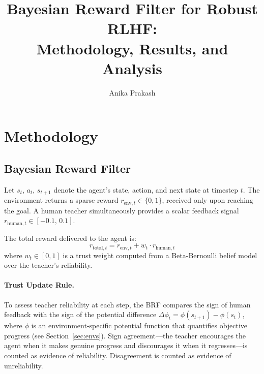 \documentclass[11pt]{article}
\title{Bayesian Reward Filter for Robust RLHF:\\
       Methodology, Results, and Analysis}
\author{Anika Prakash}
\date{}
\begin{document}
\maketitle

\section{Methodology}

\subsection{Bayesian Reward Filter}

Let $s_t$, $a_t$, $s_{t+1}$ denote the agent's state, action, and next state
at timestep $t$. The environment returns a sparse reward
$r_{\mathrm{env},t} \in \{0, 1\}$, received only upon reaching the goal. A
human teacher simultaneously provides a scalar feedback signal
$r_{\mathrm{human},t} \in [-0.1,\, 0.1]$.

The total reward delivered to the agent is:
\begin{equation}
  r_{\mathrm{total},t}
    = r_{\mathrm{env},t} + w_t \cdot r_{\mathrm{human},t}
  \label{eq:total_reward}
\end{equation}
where $w_t \in [0,1]$ is a trust weight computed from a Beta-Bernoulli belief
model over the teacher's reliability.

\paragraph{Trust Update Rule.}
To assess teacher reliability at each step, the BRF compares the sign of
human feedback with the sign of the potential difference
$\Delta\phi_t = \phi(s_{t+1}) - \phi(s_t)$, where $\phi$ is an
environment-specific potential function that quantifies objective progress
(see Section~\ref{sec:envs}). Sign agreement---the teacher encourages the
agent when it makes genuine progress and discourages it when it regresses---is
counted as evidence of reliability. Disagreement is counted as evidence of
unreliability.
\end{document}
